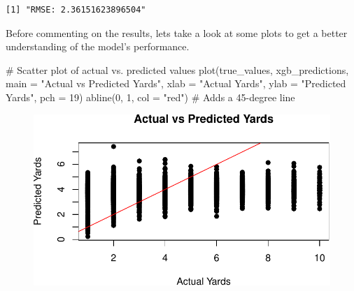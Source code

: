 \documentclass[
  super,
  preprint,
  3p]{elsarticle}
\newenvironment{Shaded}{\begin{snugshade}}{\end{snugshade}}
\newcommand{\AttributeTok}[1]{\textcolor[rgb]{0.40,0.45,0.13}{#1}}
\newcommand{\CommentTok}[1]{\textcolor[rgb]{0.37,0.37,0.37}{#1}}
\newcommand{\DecValTok}[1]{\textcolor[rgb]{0.68,0.00,0.00}{#1}}
\newcommand{\FunctionTok}[1]{\textcolor[rgb]{0.28,0.35,0.67}{#1}}
\newcommand{\NormalTok}[1]{\textcolor[rgb]{0.00,0.23,0.31}{#1}}
\newcommand{\OtherTok}[1]{\textcolor[rgb]{0.00,0.23,0.31}{#1}}
\newcommand{\SpecialCharTok}[1]{\textcolor[rgb]{0.37,0.37,0.37}{#1}}
\newcommand{\StringTok}[1]{\textcolor[rgb]{0.13,0.47,0.30}{#1}}
\begin{document}
\begin{Shaded}
\end{Shaded}

\begin{verbatim}
[1] "RMSE: 2.36151623896504"
\end{verbatim}

Before commenting on the results, lets take a look at some plots to get
a better understanding of the model's performance.

\begin{Shaded}
\begin{Highlighting}[]
\CommentTok{\# Scatter plot of actual vs. predicted values}
\FunctionTok{plot}\NormalTok{(true\_values, xgb\_predictions, }\AttributeTok{main =} \StringTok{"Actual vs Predicted Yards"}\NormalTok{, }\AttributeTok{xlab =} \StringTok{"Actual Yards"}\NormalTok{, }\AttributeTok{ylab =} \StringTok{"Predicted Yards"}\NormalTok{, }\AttributeTok{pch =} \DecValTok{19}\NormalTok{)}
\FunctionTok{abline}\NormalTok{(}\DecValTok{0}\NormalTok{, }\DecValTok{1}\NormalTok{, }\AttributeTok{col =} \StringTok{"red"}\NormalTok{)  }\CommentTok{\# Adds a 45{-}degree line}
\end{Highlighting}
\end{Shaded}

\begin{figure}[H]

{\centering \includegraphics{project_report_files/figure-pdf/unnamed-chunk-19-1.pdf}

}

\end{figure}
\end{document}
